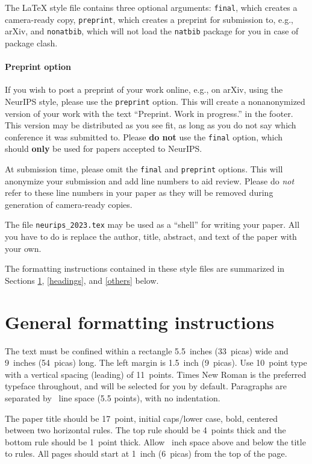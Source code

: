 \documentclass{article}
\begin{document}
\begin{CJK}{UTF8}{gbsn}
The \LaTeX{} style file contains three optional arguments: \verb+final+, which
creates a camera-ready copy, \verb+preprint+, which creates a preprint for
submission to, e.g., arXiv, and \verb+nonatbib+, which will not load the
\verb+natbib+ package for you in case of package clash.


\paragraph{Preprint option}
If you wish to post a preprint of your work online, e.g., on arXiv, using the
NeurIPS style, please use the \verb+preprint+ option. This will create a
nonanonymized version of your work with the text ``Preprint. Work in progress.''
in the footer. This version may be distributed as you see fit, as long as you do not say which conference it was submitted to. Please \textbf{do
  not} use the \verb+final+ option, which should \textbf{only} be used for
papers accepted to NeurIPS. 


At submission time, please omit the \verb+final+ and \verb+preprint+
options. This will anonymize your submission and add line numbers to aid
review. Please do \emph{not} refer to these line numbers in your paper as they
will be removed during generation of camera-ready copies.


The file \verb+neurips_2023.tex+ may be used as a ``shell'' for writing your
paper. All you have to do is replace the author, title, abstract, and text of
the paper with your own.


The formatting instructions contained in these style files are summarized in
Sections \ref{gen_inst}, \ref{headings}, and \ref{others} below.


\section{General formatting instructions}
\label{gen_inst}


The text must be confined within a rectangle 5.5~inches (33~picas) wide and
9~inches (54~picas) long. The left margin is 1.5~inch (9~picas).  Use 10~point
type with a vertical spacing (leading) of 11~points.  Times New Roman is the
preferred typeface throughout, and will be selected for you by default.
Paragraphs are separated by ~line space (5.5 points), with no
indentation.


The paper title should be 17~point, initial caps/lower case, bold, centered
between two horizontal rules. The top rule should be 4~points thick and the
bottom rule should be 1~point thick. Allow ~inch space above and
below the title to rules. All pages should start at 1~inch (6~picas) from the
top of the page.



\end{CJK}
\end{document}
